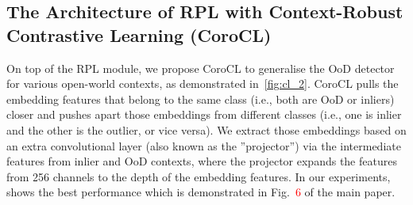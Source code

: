 \documentclass[10pt,twocolumn,letterpaper]{article}
\begin{document}
\subsection{The Architecture of RPL with Context-Robust Contrastive Learning (CoroCL)}
On top of the RPL module, we propose CoroCL to generalise the OoD detector for various open-world contexts, as demonstrated in~\cref{fig:cl_2}. CoroCL pulls the embedding features that belong to the same class (i.e., both are OoD or inliers) closer and pushes apart those embeddings from different classes (i.e., one is inlier and the other is the outlier, or vice versa). We extract those embeddings based on an extra convolutional layer (also known as the ”projector”) via the intermediate features from inlier and OoD contexts, where the projector expands the features from 256 channels to the  depth of the embedding features. In our experiments,  shows the best performance which is demonstrated in  Fig.~\textcolor{red}{6} of the main paper.
\end{document}
